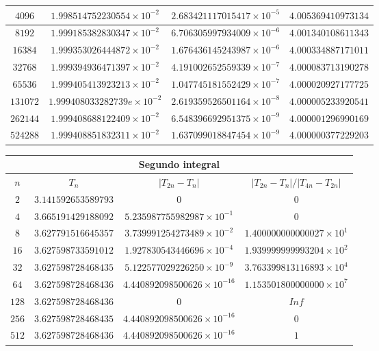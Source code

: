\documentclass[a4paper,10pt]{extarticle}
\begin{document}
\begin{enumerate}
\begin{enumerate}
\begin{center}
{\begin{tabular}{|c|c|c|c|}
\hline
$4096$&$1.998514752230554\times 10^{-2}$&$2.683421117015417\times 10^{-5}$&$4.005369410973134$\\
\hline
$8192$&$1.999185382830347\times 10^{-2}$&$6.706305997934009\times 10^{-6}$&$4.001340108611343$\\
\hline
$16384$&$1.999353026444872\times 10^{-2}$&$1.676436145243987\times 10^{-6}$&$4.000334887171011$\\
\hline
$32768$&$1.999394936471397\times 10^{-2}$&$4.191002652559339\times 10^{-7}$&$4.000083713190278$\\
\hline
$65536$&$1.999405413923213\times 10^{-2}$&$1.047745181552429\times 10^{-7}$&$4.000020927177725$\\
\hline
$131072$&$1.999408033282739e\times 10^{-2}$&$2.619359526501164\times 10^{-8}$&$4.000005233920541$\\
\hline
$262144$&$1.999408688122409\times 10^{-2}$&$6.548396692951375\times 10^{-9}$&$4.000001296990169$\\
\hline
$524288$&$1.999408851832311\times 10^{-2}$&$1.637099018847454\times 10^{-9}$&$4.000000377229203$\\
\hline
\end{tabular}}
\end{center}
\begin{center}
{\small\begin{tabular}{|c|c|c|c|}
\hline
\multicolumn{4}{|c|}{Segundo integral}\\
\hline
 $n$&$T_n$&$|T_{2n}-T_n|$&$|T_{2n}-T_n|/|T_{4n}-T_{2n}|$\\
\hline
 $2$&$3.141592653589793$&$0$&$0$\\
\hline
 $4$&$3.665191429188092$&$5.235987755982987\times 10^{-1}$&$0$\\
\hline
 $8$&$3.627791516645357$&$3.739991254273489\times 10^{-2}$&$1.400000000000027\times 10^{1}$\\
\hline
$16$&$3.627598733591012$&$1.927830543446696\times 10^{-4}$&$1.939999999993204\times 10^{2}$\\
\hline
$32$&$3.627598728468435$&$5.122577029226250\times 10^{-9}$&$3.763399813116893\times 10^{4}$\\
\hline
$64$&$3.627598728468436$&$4.440892098500626\times 10^{-16}$&$1.153501800000000\times 10^{7}$\\
\hline
$128$&$3.627598728468436$&$0$&$Inf$\\
\hline
$256$&$3.627598728468435$&$4.440892098500626\times 10^{-16}$&$0$\\
\hline
$512$&$3.627598728468436$&$4.440892098500626\times 10^{-16}$&$1$\\

\end{tabular}}
\end{center}
\end{enumerate}
\end{enumerate}
\end{document}
